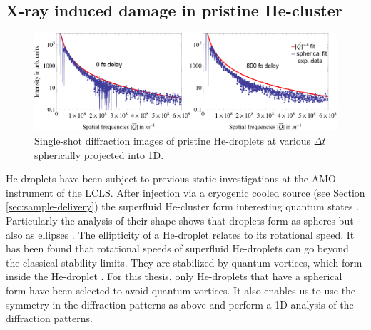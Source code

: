 \subsection{X-ray induced damage in pristine He-cluster}\label{sec:He-data-real}
%
\begin{figure}
	\centering
		\includegraphics[width=1.00\textwidth]{images/results/He-diffraction-patterns2.png}
	\caption[Single-shot diffraction images of He-droplets at different time delays]{Single-shot diffraction images of pristine He-droplets at various $\Delta t$ spherically projected into 1D.}
	\label{fig:He-diffraction-patterns}
\end{figure}
%
He-droplets have been subject to previous static investigations at the AMO instrument of the LCLS. After injection via a cryogenic cooled source (see Section \ref{sec:sample-delivery}) the superfluid He-cluster \cite{Gomez-2011-JCP} form interesting quantum states \cite{Toennies-2004-ACIE,Gomez-2012-PRL}. Particularly the analysis of their shape shows that droplets form as spheres but also as ellipses \cite{Bernado-2017-PRB}. The ellipticity of a He-droplet relates to its rotational speed. It has been found that rotational speeds of superfluid He-droplets can go beyond the classical stability limits. They are stabilized by quantum vortices, which form inside the He-droplet \cite{Gomez-2014-Science}. For this thesis, only He-droplets that have a spherical form have been selected to avoid quantum vortices. It also enables us to use the symmetry in the diffraction patterns as above and perform a 1D analysis of the diffraction patterns.
%

